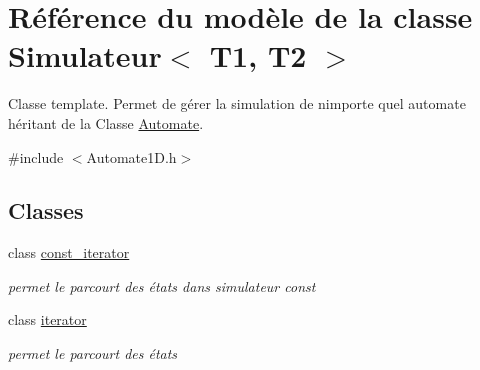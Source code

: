 \hypertarget{class_simulateur}{}\section{Référence du modèle de la classe Simulateur$<$ T1, T2 $>$}
\label{class_simulateur}


Classe template. Permet de gérer la simulation de n\textquotesingle{}importe quel automate héritant de la Classe \hyperlink{class_automate}{Automate}.  




{\ttfamily \#include $<$Automate1\+D.\+h$>$}

\subsection*{Classes}
\begin{DoxyCompactItemize}
\item 
class \hyperlink{class_simulateur_1_1const__iterator}{const\+\_\+iterator}
\begin{DoxyCompactList}\small\item\em permet le parcourt des états dans simulateur const \end{DoxyCompactList}\item 
class \hyperlink{class_simulateur_1_1iterator}{iterator}
\begin{DoxyCompactList}\small\item\em permet le parcourt des états \end{DoxyCompactList}\end{DoxyCompactItemize}
